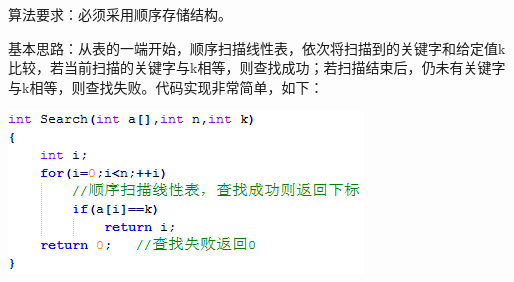 {{算法要求：}必须采用顺序存储结构。}

{{基本思路：}从表的一端开始，顺序扫描线性表，依次将扫描到的关键字和给定值k比较，若当前扫描的关键字与k相等，则查找成功；若扫描结束后，仍未有关键字与k相等，则查找失败。代码实现非常简单，如下：}{}

\includegraphics[width=3.70833in,height=1.69792in]{png-jpeg-pics/A6443AB171562CF2863483C88E45019D.png}
